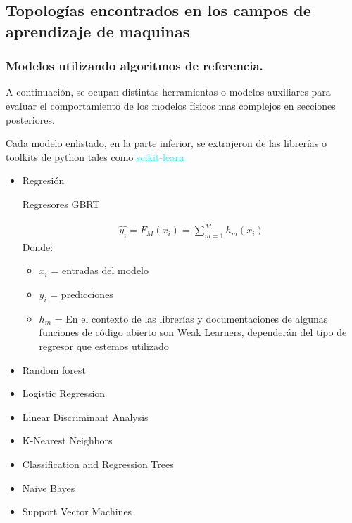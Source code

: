 \subsection{Topologías encontrados en los campos de aprendizaje de maquinas }
\subsubsection{Modelos utilizando algoritmos de referencia.}

A continuación, se ocupan distintas herramientas o modelos auxiliares para
evaluar el comportamiento de los modelos físicos mas complejos en secciones
posteriores.  

Cada modelo enlistado, en la parte inferior, se extrajeron de las librerías o
toolkits de python tales como
\href{https://scikit-learn.org/stable/}{\textcolor{cyan}{scikit-learn }}

\begin{itemize}
    \item{Regresión}

        Regresores GBRT

        \begin{align*}
            \hat{y_i} = F_M(x_i)= \sum_{m=1}^{M} h_m(x_i)
        \end{align*}
       Donde: 
        \begin{itemize}
            \item $x_i$ = entradas del modelo 
            \item $y_i$ = predicciones
            \item $h_m$ = En el contexto de las librerías y documentaciones de
                algunas funciones de código abierto  son Weak Learners,
                dependerán del tipo de regresor que estemos utilizado
        \end{itemize}
    \item{Random forest}
    \item{Logistic Regression}
    \item{Linear Discriminant Analysis}
    \item{K-Nearest Neighbors}
    \item{Classification and Regression Trees}
    \item{Naive Bayes}
    \item{Support Vector Machines}

\end{itemize}

